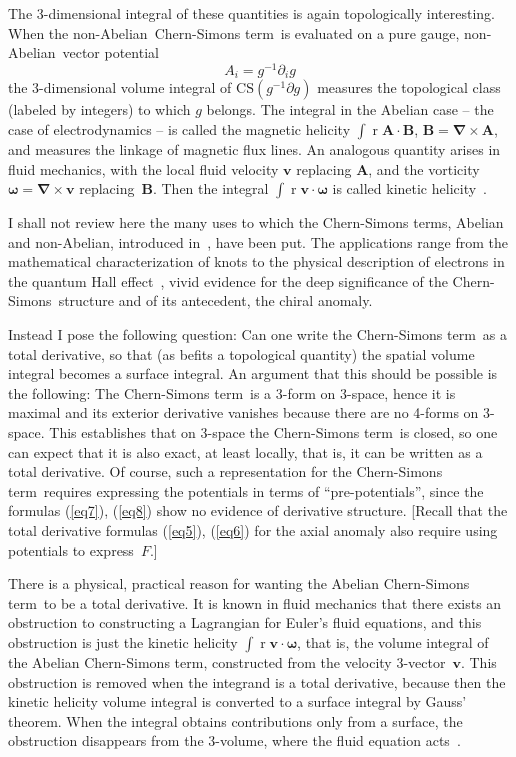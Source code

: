 \documentclass[a4paper,12pt,twoside]{article}
\newcommand{\rd}[1]{\mathop{\mathrm{d}#1}}
\newcommand{\grad}{\vec\nabla}
\newcommand{\nA}{non-Abelian}
\newcommand{\CS}{Chern-Simons}
\newcommand{\CSt}{Chern-Simons term}
\newcommand{\pp}[1]{\partial_{#1}}
\newcommand{\numeq}[2]{\begin{equation}
#2
\label{#1}
\end{equation}}
\newcommand{\refeq}[1]{(\ref{#1})}
\let\vec\boldsymbol
\begin{document}
The 3-dimensional integral of these quantities is again topologically interesting. When
the
\nA\
\CSt\ is evaluated on a pure gauge, \nA\ vector potential
\numeq{eq9}{
A_i = g^{-1} \pp i g
} 
the 3-dimensional volume integral of $\mathrm{CS}(g^{-1} \partial  g)$ measures the
topological class (labeled by integers) to which $g$ belongs. The integral in the
Abelian case -- the case of electrodynamics -- is called the magnetic helicity $\int
\rd{^3 r} \vec A\cdot
\vec B$,
$\vec B = \grad
\times \vec A$, and measures the linkage of magnetic flux lines. An analogous
quantity arises in fluid mechanics, with the local fluid velocity $\vec v$ replacing
$\vec A$, and the vorticity $\vec\omega = \grad\times\vec v$ replacing~$\vec B$. Then
the integral $\int \rd{^3 r} \vec v\cdot \vec\omega$ is called kinetic
helicity~\cite{ref8}.

I shall not review here the many uses to which the \CSt s, Abelian and \nA,
introduced in~\cite{ref7}, have been put. The applications range from the
mathematical characterization of knots to the physical description of electrons in the
quantum Hall effect~\cite{ref9},  vivid evidence for the deep significance of the \CS\
structure and of its antecedent, the chiral anomaly.

Instead I pose the following question: Can one write the \CSt\ as a total derivative, so
that (as befits a topological quantity) the spatial volume integral becomes a surface
integral. An argument that this should be possible is the following: The
\CSt\ is a 3-form on 3-space, hence it is maximal and its exterior derivative vanishes
because there are no 4-forms on 3-space. This establishes that on 3-space  the \CSt\
is closed, so one can expect that it is also exact, at least locally, that is, it can be
written as a total derivative. 
Of course, such a representation for the \CSt\ requires expressing the
potentials in terms of ``pre-potentials'', since the 
 formulas
\refeq{eq7}, \refeq{eq8} show no evidence of derivative structure.
[Recall that the total derivative formulas \refeq{eq5}, \refeq{eq6} for the axial
anomaly also require using potentials to express~$F$.]

There is a physical, practical reason for wanting the Abelian \CSt\  to be a total
derivative. It is known in fluid mechanics that there exists an obstruction to
constructing a Lagrangian for Euler's fluid equations, and this obstruction is just the
kinetic helicity  \hbox{$\int \rd{^3 r} \vec v\cdot \vec\omega$}, that is, the volume
integral of the Abelian \CSt, constructed from the velocity 3-vector~$\vec v$. This
obstruction is removed when the integrand is a total derivative, because then the
kinetic helicity volume integral is converted to a surface integral by Gauss' theorem.
When the integral obtains contributions only from a surface,  the obstruction
disappears from the 3-volume, where the fluid equation acts~\cite{ref10}. 
\end{document}
